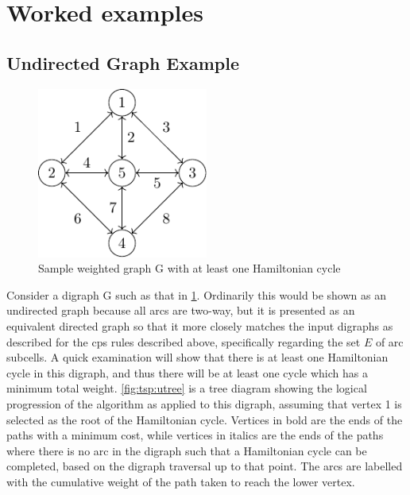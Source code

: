 \section{\label{sec:tsp:example}Worked examples}

\subsection{Undirected Graph Example}

\begin{figure}
\centering
\includegraphics[width=0.5\textwidth]{chapters/tsp/figs/ugraph-figure0}
\caption{\label{fig:tsp:ugraph}Sample weighted graph G with at least one Hamiltonian cycle}
\end{figure}

Consider a digraph G such as that in \cref{fig:tsp:ugraph}.  Ordinarily this would be shown as an undirected graph because all arcs are two-way, but it is presented as an equivalent directed graph so that it more closely matches the input digraphs as described for the \gls{cps} rules described above, specifically regarding the set \(E\) of arc subcells.  A quick examination will show that there is at least one Hamiltonian cycle in this digraph, and thus there will be at least one cycle which has a minimum total weight.  \cref{fig:tsp:utree} is a tree diagram showing the logical progression of the algorithm as applied to this digraph, assuming that vertex 1 is selected as the root of the Hamiltonian cycle.  Vertices in bold are the ends of the paths with a minimum cost, while vertices in italics are the ends of the paths where there is no arc in the digraph such that a Hamiltonian cycle can be completed, based on the digraph traversal up to that point.  The arcs are labelled with the cumulative weight of the path taken to reach the lower vertex.

